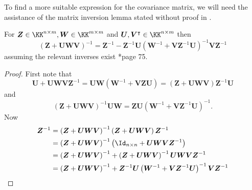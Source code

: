 To find a more suitable expression for the covariance matrix, we will need the assistance of the matrix inversion lemma stated without proof in .
\begin{lem} \label{lemma: mat_inv_lem}
    For $\bm{Z} \in \KK^{n \times m}, \bm{W} \in \KK^{m \times m}$ and $\bm{U},\bm{V}^{\intercal} \in \KK^{n \times m}$ then
    \[
        \left( \bm{Z} + \bm{U} \bm{W} \bm{V} \right)^{-1} = \bm{Z}^{-1} - \bm{Z}^{-1} \bm{U} \left( \bm{W}^{-1} + \bm{V} \bm{Z}^{-1} \bm{U} \right)^{-1} \bm{V} \bm{Z}^{-1}
    \]
    assuming the relevant inverses exist \cite{PressWilliamH.WilliamHenry1992NriC}*{page 75}.
\end{lem}

\begin{proof}
    First note that
    \[
        \bm{U} + \bm{U} \bm{W} \bm{V} \bm{Z}^{-1} = \bm{U} \bm{W} \left( \bm{W}^{-1} + \bm{V} \bm{Z} \bm{U} \right) = \left( \bm{Z} + \bm{U} \bm{W} \bm{V} \right) \bm{Z}^{-1} \bm{U}
    \]
    and
    \[
        \left( \bm{Z} + \bm{U} \bm{W} \bm{V} \right)^{-1} \bm{U} \bm{W} = \bm{Z} \bm{U} \left( \bm{W}^{-1} + \bm{V} \bm{Z}^{-1} \bm{U} \right)^{-1}.
    \]
    Now
    \begin{align*}
        \bm{Z}^{-1} & = \left( \bm{Z} + \bm{U} \bm{W} \bm{V} \right)^{-1} \left( \bm{Z} + \bm{U} \bm{W} \bm{V} \right) \bm{Z}^{-1}                                            \\
                    & = \left( \bm{Z} + \bm{U} \bm{W} \bm{V} \right)^{-1} \left( \Id_{n \times n} + \bm{U} \bm{W} \bm{V} \bm{Z}^{-1} \right)                                  \\
                    & = \left( \bm{Z} + \bm{U} \bm{W} \bm{V} \right)^{-1} + \left( \bm{Z} + \bm{U} \bm{W} \bm{V} \right)^{-1} \bm{U} \bm{W} \bm{V} \bm{Z}^{-1}                \\
                    & = \left( \bm{Z} + \bm{U} \bm{W} \bm{V} \right)^{-1} + \bm{Z}^{-1} \bm{U} \left( \bm{W}^{-1} + \bm{V} \bm{Z}^{-1} \bm{U} \right)^{-1} \bm{V} \bm{Z}^{-1} \\
    \end{align*}
\end{proof}

